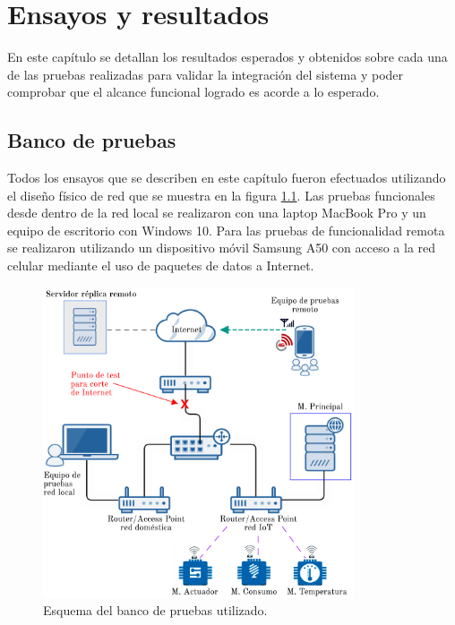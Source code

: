 
\chapter{Ensayos y resultados} %

\label{Chapter4} %


En este capítulo se detallan los resultados esperados y obtenidos sobre cada una de las pruebas realizadas para validar la integración del sistema y poder comprobar que el alcance funcional logrado es acorde a lo esperado.


\section{Banco de pruebas}

Todos los ensayos que se describen en este capítulo fueron efectuados utilizando el diseño físico de red que se muestra en la figura \ref{fig:banco}. Las pruebas funcionales desde dentro de la red local se realizaron con una laptop MacBook Pro y un equipo de escritorio con Windows 10. Para las pruebas de funcionalidad remota se realizaron utilizando un dispositivo móvil Samsung A50 con acceso a la red celular mediante el uso de paquetes de datos a Internet.

\begin{figure}[htbp]
	\centering
	\includegraphics[width=0.82\textwidth]{./Figures/banco2.png}
	\caption{Esquema del banco de pruebas utilizado.}

	\label{fig:banco}
\end{figure}


